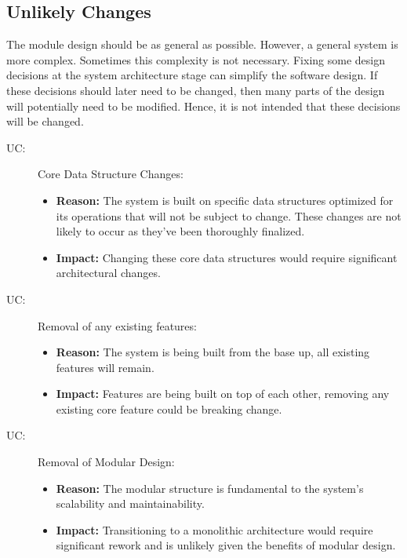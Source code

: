 \documentclass[12pt, titlepage]{article}
\newcounter{ucnum}
\newcommand{\uctheucnum}{UC\theucnum}
\begin{document}
\subsection{Unlikely Changes} \label{SecUchange}

The module design should be as general as possible. However, a general system is
more complex. Sometimes this complexity is not necessary. Fixing some design
decisions at the system architecture stage can simplify the software design. If
these decisions should later need to be changed, then many parts of the design
will potentially need to be modified. Hence, it is not intended that these
decisions will be changed.

\begin{description}


\item[ \uctheucnum \label{ucCoreData}:] Core Data Structure Changes:
  \begin{itemize}
    \item \textbf{Reason:} The system is built on specific data structures optimized for its operations that will not be subject to change. These changes are not likely to occur as they've been thoroughly finalized. 
    \item \textbf{Impact:} Changing these core data structures would require significant architectural changes.
  \end{itemize}

\item[ \uctheucnum \label{ucAuth}:] Removal of any existing features:
  \begin{itemize}
    \item \textbf{Reason:} The system is being built from the base up, all existing features will remain.
    \item \textbf{Impact:} Features are being built on top of each other, removing any existing core feature could be breaking change.
  \end{itemize}

\item[ \uctheucnum \label{ucModular}:] Removal of Modular Design:
  \begin{itemize}
    \item \textbf{Reason:} The modular structure is fundamental to the system's scalability and maintainability.
    \item \textbf{Impact:} Transitioning to a monolithic architecture would require significant rework and is unlikely given the benefits of modular design.
  \end{itemize}


\end{description}
\end{document}
